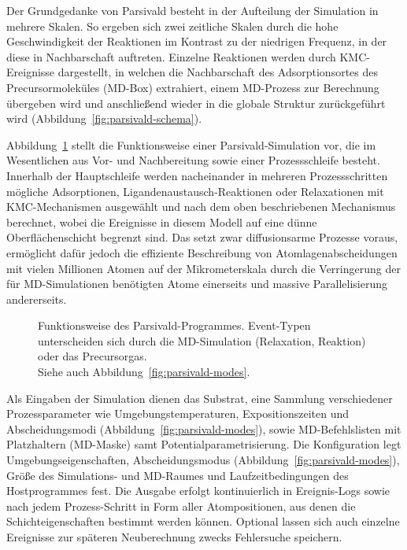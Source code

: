Der Grundgedanke von Parsivald besteht in der Aufteilung der Simulation in mehrere Skalen.
So ergeben sich zwei zeitliche Skalen durch die hohe Geschwindigkeit der Reaktionen im Kontrast zu der niedrigen Frequenz, in der diese in Nachbarschaft auftreten.
Einzelne Reaktionen werden durch KMC-Ereignisse dargestellt, in welchen die Nachbarschaft des Adsorptionsortes des Precursormoleküles (MD-Box) extrahiert, einem MD-Prozess zur Berechnung übergeben wird und anschließend wieder in die globale Struktur zurückgeführt wird (Abbildung~\ref{fig:parsivald-schema}).

Abbildung~\ref{fig:parsivald-stephierarchy} stellt die Funktionsweise einer Parsivald-Simulation vor, die im Wesentlichen aus Vor- und Nachbereitung sowie einer Prozessschleife besteht.
Innerhalb der Hauptschleife werden nacheinander in mehreren Prozessschritten mögliche Adsorptionen, Ligandenaustausch-Reaktionen oder Relaxationen mit KMC-Mechanismen ausgewählt und nach dem oben beschriebenen Mechanismus berechnet, wobei die Ereignisse in diesem Modell auf eine dünne Oberflächenschicht begrenzt sind.
Das setzt zwar diffusionsarme Prozesse voraus, ermöglicht dafür jedoch die effiziente Beschreibung von Atomlagenabscheidungen mit vielen Millionen Atomen auf der Mikrometerskala durch die Verringerung der für MD-Simulationen benötigten Atome einerseits und massive Parallelisierung andererseits.

\begin{figure}
  \centering
  \def\svgwidth{\textwidth}
  
  \caption[Funktionsweise des Parsivald-Programmes]{
    Funktionsweise des Parsivald-Programmes.
    Event-Typen unterscheiden sich durch die MD-Simulation (Relaxation, Reaktion) oder das Precursorgas.\\
    Siehe auch Abbildung~\ref{fig:parsivald-modes}.
  }
  \label{fig:parsivald-stephierarchy}
\end{figure}

Als Eingaben der Simulation dienen das Substrat, eine Sammlung verschiedener Prozessparameter wie Umgebungstemperaturen, Expositionszeiten und Abscheidungsmodi (Abbildung~\ref{fig:parsivald-modes}), sowie MD-Befehlslisten mit Platzhaltern (MD-Maske) samt Potentialparametrisierung.
Die Konfiguration legt Umgebungseigenschaften, Abscheidungsmodus (Abbildung~\ref{fig:parsivald-modes}), Größe des Si\-mu\-la\-tions- und MD-Raumes und Laufzeitbedingungen des Hostprogrammes fest.
Die Ausgabe erfolgt kontinuierlich in Ereignis-Logs sowie nach jedem Prozess-Schritt in Form aller Atompositionen, aus denen die Schichteigenschaften bestimmt werden können.
Optional lassen sich auch einzelne Ereignisse zur späteren Neuberechnung zwecks Fehlersuche speichern.


